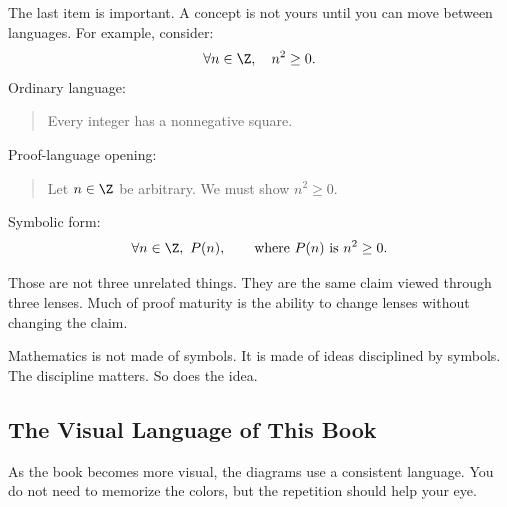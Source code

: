 The last item is important. A concept is not yours until you can move between languages. For example, consider:
\[
\forall n\in\Z,\quad n^2\geq 0.
\]
Ordinary language:

\begin{quote}
Every integer has a nonnegative square.
\end{quote}

Proof-language opening:

\begin{quote}
Let $n\in\Z$ be arbitrary. We must show $n^2\geq 0$.
\end{quote}

Symbolic form:
\[
\forall n\in\Z,\ P(n),
\qquad\text{where }P(n)\text{ is }n^2\geq0.
\]

Those are not three unrelated things. They are the same claim viewed through three lenses. Much of proof maturity is the ability to change lenses without changing the claim.

\begin{intuitionbox}
Mathematics is not made of symbols. It is made of ideas disciplined by symbols. The discipline matters. So does the idea.
\end{intuitionbox}

\subsection{The Visual Language of This Book}

As the book becomes more visual, the diagrams use a consistent language. You do
not need to memorize the colors, but the repetition should help your eye.

\begin{center}
\end{center}


